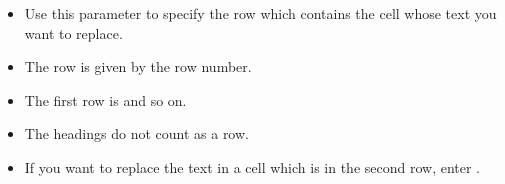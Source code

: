 \begin{itemize}
\item Use this parameter to specify the row which contains the cell whose text you want to replace.
\item The row is given by the row number.
\item The first row is  and so on.
\item The headings do not count as a row. 
\item If you want to replace the text in  a cell which is in the second row, enter . 
\end{itemize}    

